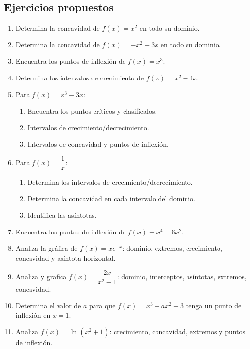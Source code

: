 \documentclass[12pt, letterpaper]{article}
\begin{document}
\subsection{Ejercicios propuestos}

\begin{enumerate}[resume=ejercicios, leftmargin=*]
  \item \facil{} Determina la concavidad de $f(x) = x^2$ en todo su dominio.

  \item \facil{} Determina la concavidad de $f(x) = -x^2 + 3x$ en todo su dominio.

  \item \facil{} Encuentra los puntos de inflexión de $f(x) = x^3$.

  \item \facil{} Determina los intervalos de crecimiento de $f(x) = x^2 - 4x$.

  \item \medio{} Para $f(x) = x^3 - 3x$:
        \begin{enumerate}[label=\alph*)]
          \item Encuentra los puntos críticos y clasifícalos.
          \item Intervalos de crecimiento/decrecimiento.
          \item Intervalos de concavidad y puntos de inflexión.
        \end{enumerate}

  \item \medio{} Para $f(x) = \dfrac{1}{x}$:
        \begin{enumerate}[label=\alph*)]
          \item Determina los intervalos de crecimiento/decrecimiento.
          \item Determina la concavidad en cada intervalo del dominio.
          \item Identifica las asíntotas.
        \end{enumerate}

  \item \medio{} Encuentra los puntos de inflexión de $f(x) = x^4 - 6x^2$.

  \item \medio{} Analiza la gráfica de $f(x) = x e^{-x}$: dominio, extremos, crecimiento, concavidad y asíntota horizontal.

  \item \dificil{} Analiza y grafica $f(x) = \dfrac{2x}{x^2 - 1}$: dominio, interceptos, asíntotas, extremos, concavidad.

  \item \dificil{} Determina el valor de $a$ para que $f(x) = x^3 - ax^2 + 3$ tenga un punto de inflexión en $x = 1$.

  \item \dificil{} Analiza $f(x) = \ln(x^2 + 1)$: crecimiento, concavidad, extremos y puntos de inflexión.
\end{enumerate}
\end{document}
